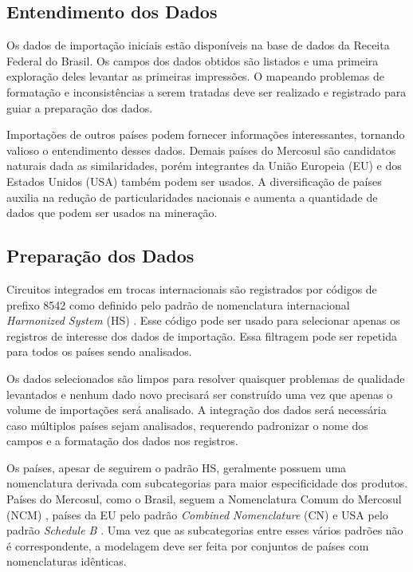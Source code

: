 \documentclass[conference,compsoc]{IEEEtran}
\begin{document}
\subsection{Entendimento dos Dados}

Os dados de importação iniciais estão disponíveis na base de dados da Receita Federal do Brasil. Os campos dos dados obtidos são listados e uma primeira exploração deles levantar as primeiras impressões. O mapeando problemas de formatação e inconsistências a serem tratadas deve ser realizado e registrado para guiar a preparação dos dados.

Importações de outros países podem fornecer informações interessantes, tornando valioso o entendimento desses dados. Demais países do Mercosul são candidatos naturais dada as similaridades, porém integrantes da União Europeia (EU) e dos Estados Unidos (USA) também podem ser usados. A diversificação de países auxilia na redução de particularidades nacionais e aumenta a quantidade de dados que podem ser usados na mineração.

\subsection{Preparação dos Dados}

Circuitos integrados em trocas internacionais são registrados por códigos de prefixo 8542 como definido pelo padrão de nomenclatura internacional \textit{Harmonized System} (HS) \cite{standard_hs}. Esse código pode ser usado para selecionar apenas os registros de interesse dos dados de importação. Essa filtragem pode ser repetida para todos os países sendo analisados.

Os dados selecionados são limpos para resolver quaisquer problemas de qualidade levantados e nenhum dado novo precisará ser construído uma vez que apenas o volume de importações será analisado. A integração dos dados será necessária caso múltiplos países sejam analisados, requerendo padronizar o nome dos campos e a formatação dos dados nos registros.

Os países, apesar de seguirem o padrão HS, geralmente possuem uma nomenclatura derivada com subcategorias para maior especificidade dos produtos. Países do Mercosul, como o Brasil, seguem a Nomenclatura Comum do Mercosul (NCM) \cite{standard_ncm}, países da EU pelo padrão \textit{Combined Nomenclature} (CN) \cite{standard_cn} e USA pelo padrão \textit{Schedule B} \cite{standard_scheduleb}. Uma vez que as subcategorias entre esses vários padrões não é correspondente, a modelagem deve ser feita por conjuntos de países com nomenclaturas idênticas.
\end{document}
